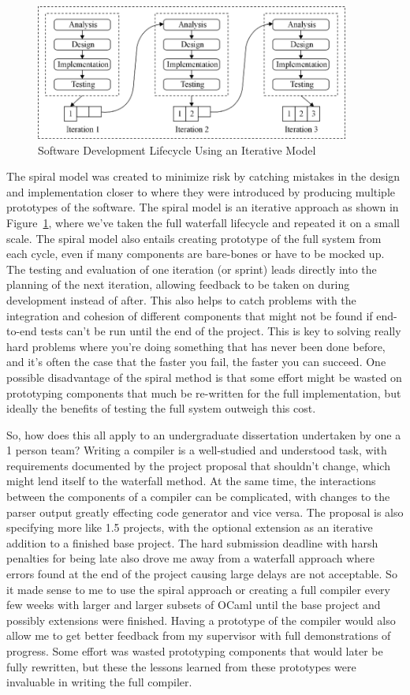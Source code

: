 \documentclass[12pt,a4paper,twoside,openright]{report}
\begin{document}
\begin{figure}[tbh]
\centerline{\includegraphics[height=1.75in]{iterative}}
\caption{Software Development Lifecycle Using an Iterative Model}
\label{iterativefig}
\end{figure}
The spiral model was created to minimize risk by catching mistakes in the design and implementation closer to where they were introduced by producing multiple prototypes of the software.
The spiral model is an iterative approach as shown in Figure~\ref{iterativefig}, where we've taken the full waterfall lifecycle and repeated it on a small scale.
The spiral model also entails creating prototype of the full system from each cycle, even if many components are bare-bones or have to be mocked up.
The testing and evaluation of one iteration (or sprint) leads directly into the planning of the next iteration, allowing feedback to be taken on during development instead of after.
This also helps to catch problems with the integration and cohesion of different components that might not be found if end-to-end tests can't be run until the end of the project.
This is key to solving really hard problems where you're doing something that has never been done before, and it's often the case that the faster you fail, the faster you can succeed.
One possible disadvantage of the spiral method is that some effort might be wasted on prototyping components that much be re-written for the full implementation, but ideally the benefits of testing the full system outweigh this cost.

So, how does this all apply to an undergraduate dissertation undertaken by one a 1 person team?
Writing a compiler is a well-studied and understood task, with requirements documented by the project proposal that shouldn't change, which might lend itself to the waterfall method.
At the same time, the interactions between the components of a compiler can be complicated, with changes to the parser output greatly effecting code generator and vice versa.
The proposal is also specifying more like 1.5 projects, with the optional extension as an iterative addition to a finished base project.
The hard submission deadline with harsh penalties for being late also drove me away from a waterfall approach where errors found at the end of the project causing large delays are not acceptable.
So it made sense to me to use the spiral approach or creating a full compiler every few weeks with larger and larger subsets of OCaml until the base project and possibly extensions were finished.
Having a prototype of the compiler would also allow me to get better feedback from my supervisor with full demonstrations of progress.
Some effort was wasted prototyping components that would later be fully rewritten, but these the lessons learned from these prototypes were invaluable in writing the full compiler.
\end{document}
